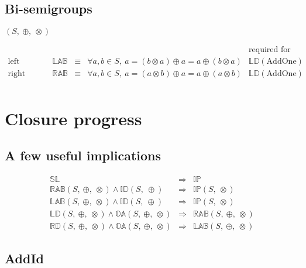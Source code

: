 \documentclass[10pt]{article}
\newcommand{\propname}[1]{{\mathbb{#1}}}
\begin{document}
\subsection{Bi-semigroups}
$(S,\ \oplus,\ \otimes)$

\[ 
\begin{array}{c|ccl|l} 
   & 
   & 
   & 
   & \mbox{required for} 
   \\ \hline 
\mbox{left absorption}  
    & \propname{LAB}
    & \equiv 
    & \forall a, b\in S,\ a =  (b\otimes a) \oplus a = a \oplus (b \otimes a) 
    & \propname{LD}(\mathrm{AddOne})
   \\ 
\mbox{right absorption}  
    & \propname{RAB}
    & \equiv 
    & \forall a, b\in S,\ a =  (a\otimes b) \oplus a = a \oplus (a \otimes b) 
    & \propname{LD}(\mathrm{AddOne})
   \\ 
\end{array} 
\] 


\section{Closure progress}

\subsection{A few useful implications} 

\[ 
\begin{array}{rcl} 
\propname{SL}
   & \Rightarrow 
   & \propname{IP}\\ 
\propname{RAB}(S,\ \oplus,\ \otimes) \wedge \propname{ID}(S,\ \oplus)
    & \Rightarrow 
    & \propname{IP}(S,\ \otimes)\\ 
\propname{LAB}(S,\ \oplus,\ \otimes) \wedge \propname{ID}(S,\ \oplus)
    & \Rightarrow 
    & \propname{IP}(S,\ \otimes)\\ 
\propname{LD}(S,\ \oplus,\ \otimes) \wedge \propname{OA}(S,\ \oplus,\ \otimes)
    & \Rightarrow 
    & \propname{RAB}(S,\ \oplus,\ \otimes) \\ 
\propname{RD}(S,\ \oplus,\ \otimes) \wedge \propname{OA}(S,\ \oplus,\ \otimes) 
    & \Rightarrow 
    & \propname{LAB}(S,\ \oplus,\ \otimes)
\end{array} 
\] 



\subsection{AddId} 
\end{document}
